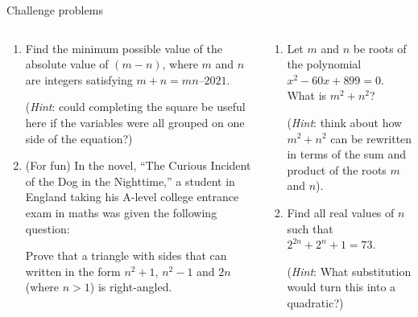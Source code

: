 \documentclass[9pt,aspectratio=169]{beamer}
\begin{document}
\begin{frame}{Challenge problems}
  \begin{columns}[T]
    \begin{column}{0.5\textwidth}
      \begin{enumerate}
        \item Find the minimum possible value of the absolute value of $(m - n)$, where $m$ and $n$ are integers satisfying $m + n = mn – 2021$. 
        
        (\emph{Hint}: could completing the square be useful here if the variables were all grouped on one side of the equation?)
        \item (For fun) In the novel, “The Curious Incident of the Dog in the Nighttime,” a student in England taking his A-level college entrance exam in maths was given the following question: 
        
        Prove that a triangle with sides that can written in the form $n^2 +1$, $n^2 -1$ and $2n$ (where $n > 1$) is right-angled.  
        \seti
      \end{enumerate}
    \end{column}
    \begin{column}{0.5\textwidth}
      \begin{enumerate}
        \conti
        \item Let $m$ and $n$ be roots of the polynomial $x^2 − 60x + 899 = 0.$  What is $m^2 + n^2$? 
        
        (\emph{Hint}: think about how $m^2 + n^2$ can be rewritten in terms of the sum and product of the roots $m$ and $n$).
        \item Find all real values of $n$ such that $2^{2n} + 2^n + 1 = 73$.  
        
        (\emph{Hint}:  What substitution would turn this into a quadratic?)
      \end{enumerate}
    \end{column}
  \end{columns}
\end{frame}

\end{document}
